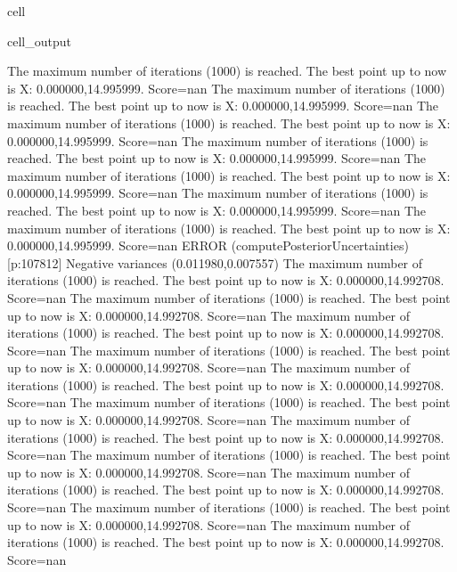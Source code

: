 \documentclass[letterpaper,10pt,english]{jupyterBook}
\begin{document}
\begin{sphinxuseclass}{cell}
\begin{sphinxVerbatimOutput}
\begin{sphinxuseclass}{cell_output}
\begin{sphinxVerbatim}[commandchars=\\\{\}]
The maximum number of iterations (1000) is reached. The best point up to now is X: \PYGZob{}0.000000,14.995999\PYGZcb{}. Score=\PYGZhy{}nan
The maximum number of iterations (1000) is reached. The best point up to now is X: \PYGZob{}0.000000,14.995999\PYGZcb{}. Score=\PYGZhy{}nan
The maximum number of iterations (1000) is reached. The best point up to now is X: \PYGZob{}0.000000,14.995999\PYGZcb{}. Score=\PYGZhy{}nan
The maximum number of iterations (1000) is reached. The best point up to now is X: \PYGZob{}0.000000,14.995999\PYGZcb{}. Score=\PYGZhy{}nan
The maximum number of iterations (1000) is reached. The best point up to now is X: \PYGZob{}0.000000,14.995999\PYGZcb{}. Score=\PYGZhy{}nan
The maximum number of iterations (1000) is reached. The best point up to now is X: \PYGZob{}0.000000,14.995999\PYGZcb{}. Score=\PYGZhy{}nan
The maximum number of iterations (1000) is reached. The best point up to now is X: \PYGZob{}0.000000,14.995999\PYGZcb{}. Score=\PYGZhy{}nan
ERROR (compute\PYGZus{}Posterior\PYGZus{}Uncertainties) [p:107812] Negative variances (0.011980,\PYGZhy{}0.007557)
The maximum number of iterations (1000) is reached. The best point up to now is X: \PYGZob{}0.000000,14.992708\PYGZcb{}. Score=\PYGZhy{}nan
The maximum number of iterations (1000) is reached. The best point up to now is X: \PYGZob{}0.000000,14.992708\PYGZcb{}. Score=\PYGZhy{}nan
The maximum number of iterations (1000) is reached. The best point up to now is X: \PYGZob{}0.000000,14.992708\PYGZcb{}. Score=\PYGZhy{}nan
The maximum number of iterations (1000) is reached. The best point up to now is X: \PYGZob{}0.000000,14.992708\PYGZcb{}. Score=\PYGZhy{}nan
The maximum number of iterations (1000) is reached. The best point up to now is X: \PYGZob{}0.000000,14.992708\PYGZcb{}. Score=\PYGZhy{}nan
The maximum number of iterations (1000) is reached. The best point up to now is X: \PYGZob{}0.000000,14.992708\PYGZcb{}. Score=\PYGZhy{}nan
The maximum number of iterations (1000) is reached. The best point up to now is X: \PYGZob{}0.000000,14.992708\PYGZcb{}. Score=\PYGZhy{}nan
The maximum number of iterations (1000) is reached. The best point up to now is X: \PYGZob{}0.000000,14.992708\PYGZcb{}. Score=\PYGZhy{}nan
The maximum number of iterations (1000) is reached. The best point up to now is X: \PYGZob{}0.000000,14.992708\PYGZcb{}. Score=\PYGZhy{}nan
The maximum number of iterations (1000) is reached. The best point up to now is X: \PYGZob{}0.000000,14.992708\PYGZcb{}. Score=\PYGZhy{}nan
The maximum number of iterations (1000) is reached. The best point up to now is X: \PYGZob{}0.000000,14.992708\PYGZcb{}. Score=\PYGZhy{}nan

\end{sphinxVerbatim}
\end{sphinxuseclass}
\end{sphinxVerbatimOutput}
\end{sphinxuseclass}
\end{document}
